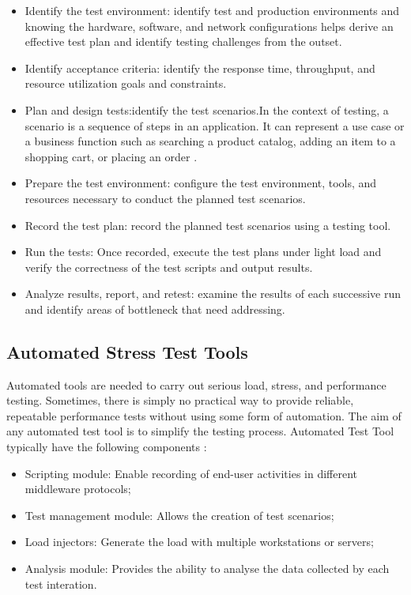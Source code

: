 \documentclass[review]{elsarticle}
\begin{document}
\begin{itemize}
\item Identify the test environment: identify test and production environments and knowing the hardware, software, and network configurations helps derive an effective test plan and identify testing challenges from the outset.

\item Identify acceptance criteria: identify the response time, throughput, and resource utilization goals and constraints.

\item Plan and design tests:identify the test scenarios.In the context of testing, a scenario is a sequence of steps in an application. It can represent a use case or a business function such as searching a product catalog, adding an item to a shopping cart, or placing an order \cite{Corporation2007}.

\item Prepare the test environment: configure the test environment, tools, and resources necessary to conduct the planned test scenarios.

\item Record the test plan: record the planned test scenarios using a testing tool.

\item Run the tests: Once recorded, execute the test plans under light load and verify the correctness of the test scripts and output results.

\item Analyze results, report, and retest: examine the results of each successive run and identify areas of bottleneck that need addressing.  

\end{itemize}



\subsection{Automated Stress Test Tools}

Automated tools are needed to carry out serious load, stress, and performance testing. Sometimes, there is simply no practical way to provide reliable, repeatable performance tests without using some form of automation. The aim of any automated test tool is to simplify the testing process. Automated Test Tool  typically have the following components \cite{Molyneaux2009}:

\begin{itemize}
\item Scripting module: Enable recording of end-user activities in different middleware protocols;
\item Test management module: Allows the creation of test scenarios;
\item Load injectors: Generate the load with multiple workstations or servers;
\item Analysis module: Provides the ability to analyse the data collected by each test interation.
\end{itemize}
\end{document}
